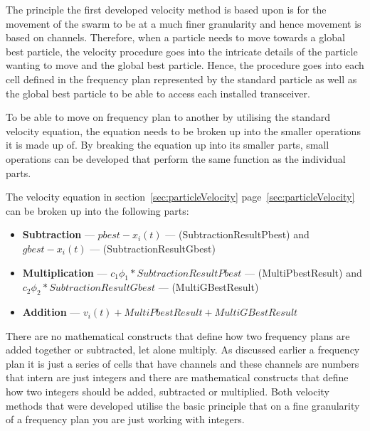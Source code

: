 The principle the first developed velocity method is based upon is for the movement of the swarm to be at a much finer granularity and hence movement is based on channels. Therefore, when a particle needs to move towards a global best particle, the velocity procedure goes into the intricate details of the particle wanting to move and the global best particle. Hence, the procedure goes into each cell defined in the frequency plan represented by the standard particle as well as the global best particle to be able to access each installed transceiver.

To be able to move on frequency plan to another by utilising the standard velocity equation, the equation needs to be broken up into the smaller operations it is made up of. By breaking the equation up into its smaller parts, small operations can be developed that perform the same function as the individual parts. 

The velocity equation in section~\ref{sec:particleVelocity} page~\ref{sec:particleVelocity} can be broken up into the following parts:
\label{lst:velocitybreakup}
\begin{itemize}
\item \textbf{Subtraction} --- $pbest - x_i(t)$ --- (SubtractionResultPbest) and $gbest - x_i(t)$ --- (SubtractionResultGbest)
\item \textbf{Multiplication} --- $c_1\phi_1 * SubtractionResultPbest$ --- (MultiPbestResult) and $c_2\phi_2 * SubtractionResultGbest$ --- (MultiGBestResult)
\item \textbf{Addition} --- $v_i(t) + MultiPbestResult + MultiGBestResult$
\end{itemize}
There are no mathematical constructs that define how two frequency plans are added together or subtracted, let alone multiply. As discussed earlier a frequency plan it is just a series of cells that have channels and these channels are numbers that intern are just integers and there are mathematical constructs that define how two integers should be added, subtracted or multiplied. Both velocity methods that were developed utilise the basic principle that on a fine granularity of a frequency plan you are just working with integers.


